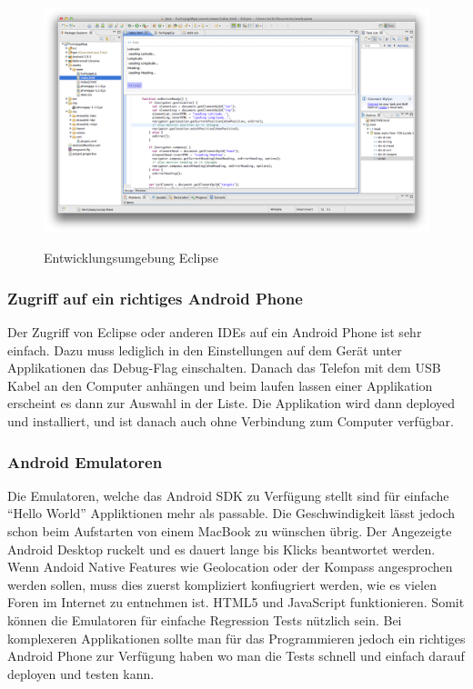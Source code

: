 \begin{figure}[H]
	\centering			      
        \includegraphics[width=14cm]{images/eclipse-shot.png}\\
		\caption{Entwicklungsumgebung Eclipse}
	\label{fig:eclipse-project}
\end{figure}

\subsubsection{Zugriff auf ein richtiges Android Phone} %
\label{ssub:Zugriff auf ein richtiges Android Phone}
Der Zugriff von Eclipse oder anderen IDEs auf ein Android Phone ist sehr einfach. Dazu muss lediglich in den Einstellungen auf dem Gerät unter Applikationen das Debug-Flag einschalten. Danach das Telefon mit dem USB Kabel an den Computer anhängen und beim laufen lassen einer Applikation erscheint es dann zur Auswahl in der Liste. Die Applikation wird dann deployed und installiert, und ist danach auch ohne Verbindung zum Computer verfügbar.

\subsubsection{Android Emulatoren} %
\label{ssub:Android Emulatoren}
Die Emulatoren, welche das Android SDK zu Verfügung stellt sind für einfache "`Hello World"' Appliktionen mehr als passable. Die Geschwindigkeit lässt jedoch schon beim Aufstarten von einem MacBook zu wünschen übrig. Der Angezeigte Android Desktop ruckelt und es dauert lange bis Klicks beantwortet werden. Wenn Andoid Native Features wie Geolocation oder der Kompass angesprochen werden sollen, muss dies zuerst kompliziert konfiugriert werden, wie es vielen Foren im Internet zu entnehmen ist. HTML5 und JavaScript funktionieren. Somit können die Emulatoren für einfache Regression Tests nützlich sein. Bei komplexeren Applikationen sollte man für das Programmieren jedoch ein richtiges Android Phone zur Verfügung haben wo man die Tests schnell und einfach darauf deployen und testen kann.

